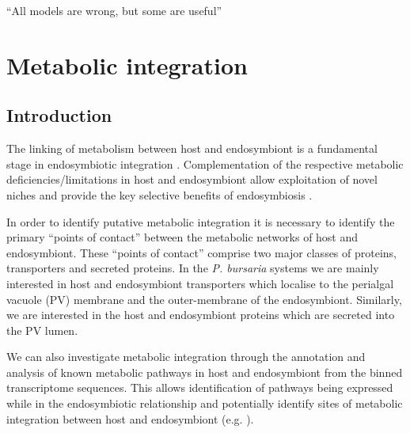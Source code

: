 \graphicspath{{chapters/5.Chapter_3/figures/}}

\begin{savequote}[75mm]
``All models are wrong, but some are useful''
\end{savequote}

\chapter{Metabolic integration}

\section{Introduction}

The linking of metabolism between host and endosymbiont is a fundamental 
stage in endosymbiotic integration \citep{Bhattacharya2007,Karkar2015a}.
Complementation of the respective metabolic deficiencies/limitations in
host and endosymbiont allow exploitation of novel niches and provide
the key selective benefits of endosymbiosis \citep{Hoffmeister2003}.

In order to identify putative metabolic integration it is necessary to
identify the primary ``points of contact'' between the metabolic networks 
of host and endosymbiont. These ``points of contact'' comprise two
major classes of proteins, transporters and secreted proteins. 
In the \textit{P. bursaria} systems we are mainly interested in
host and endosymbiont transporters which localise to the
perialgal vacuole (PV) membrane and the outer-membrane of the endosymbiont.
Similarly, we are interested in the host and endosymbiont proteins
which are secreted into the PV lumen. 


We can also investigate metabolic integration through the annotation and analysis
of known metabolic pathways in host and endosymbiont from the binned transcriptome
sequences.  This allows identification of pathways being expressed while
in the endosymbiotic relationship and potentially identify 
sites of metabolic integration between host and endosymbiont (e.g. \citep{Russell2013}).



